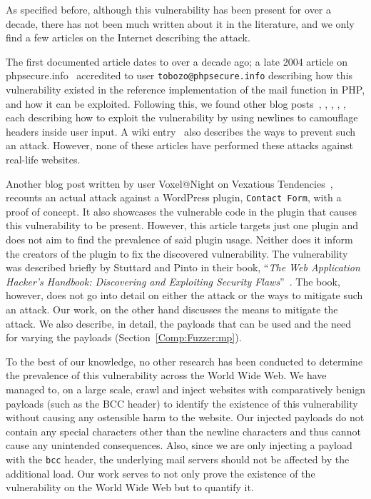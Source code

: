 As specified before, although this vulnerability has been present for over a decade, there has not been much written about it in the literature, and we only find a few articles on the Internet describing the attack.

The first documented article dates to over a decade ago; a late 2004 article on phpsecure.info~\cite{Tobozo} accredited to user \lstinline|tobozo@phpsecure.info| describing how this vulnerability existed in the reference implementation of the mail function in PHP, and how it can be exploited. Following this, we found other blog posts~\cite{Calin}, \cite{DK}, \cite{Injection2}, \cite{Nicol}, \cite{Pope}, each describing how to exploit the vulnerability by using newlines to camouflage headers inside user input. A wiki entry~\cite{Injection} also describes the ways to prevent such an attack. However, none of these articles have performed these attacks against real-life websites.

Another blog post written by user Voxel@Night on Vexatious Tendencies~\cite{Tendencies2014}, recounts an actual attack against a WordPress plugin, \texttt{Contact Form}, with a proof of concept\footnotemark. It also showcases the vulnerable code in the plugin that causes this vulnerability to be present. However, this article targets just one plugin and does not aim to find the prevalence of said plugin usage. Neither does it inform the creators of the plugin to fix the discovered vulnerability.
The vulnerability was described briefly by Stuttard and Pinto in their book, ``\emph{The Web Application Hacker's Handbook: Discovering and Exploiting Security Flaws}''~\cite{stuttard2011web}. The book, however, does not go into detail on either the attack or the ways to mitigate such an attack. Our work, on the other hand discusses the means to mitigate the attack. We also describe, in detail, the payloads that can be used and the need for varying the payloads (Section~\ref{Comp:Fuzzer:mp}).

To the best of our knowledge, no other research has been conducted to determine the prevalence of this vulnerability across the World Wide Web. We have managed to, on a large scale, crawl and inject websites with comparatively benign payloads (such as the BCC header) to identify the existence of this vulnerability without causing any ostensible harm to the website. Our injected payloads do not contain any special characters other than the newline characters and thus cannot cause any unintended consequences. Also, since we are only injecting a payload with the \texttt{bcc} header, the underlying mail servers should not be affected by the additional load. Our work serves to not only prove the existence of the vulnerability on the World Wide Web but to quantify it.
